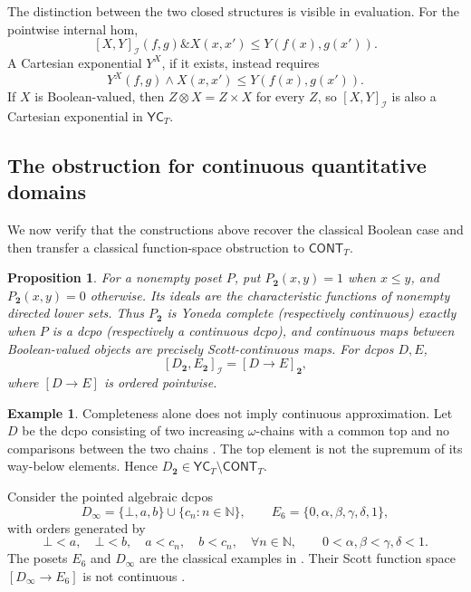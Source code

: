 \documentclass[preprint,3p,times]{elsarticle}
\newtheorem{proposition}[proposition]{Proposition}
\theoremstyle{definition}
\newtheorem{example}[example]{Example}
\theoremstyle{remark}
\newcommand{\I}{\mathcal{I}}
\newcommand{\CONT}{\mathsf{CONT}}
\newcommand{\YC}{\mathsf{YC}}
\newcommand{\tn}{\mathbin{\&}}
\numberwithin{equation}{section}
\begin{document}
The distinction between the two closed structures is visible in evaluation. For the pointwise internal hom,
\[
 [X,Y]_{\I}(f,g)\tn X(x,x')\leq Y(f(x),g(x')).
\]
A Cartesian exponential \(Y^X\), if it exists, instead requires
\[
 Y^X(f,g)\wedge X(x,x')\leq Y(f(x),g(x')).
\]
If \(X\) is Boolean-valued, then \(Z\otimes X=Z\times X\) for every \(Z\), so \([X,Y]_{\I}\) is also a Cartesian exponential in \(\YC_T\).

\subsection{The obstruction for continuous quantitative domains}
We now verify that the constructions above recover the classical Boolean case and then transfer a classical function-space obstruction to \(\CONT_T\).

\begin{proposition}\cite[Sections~9 and~17]{Zhang2024}\label{prop:boolean-correspondence}
For a nonempty poset \(P\), put \(P_{\mathbf2}(x,y)=1\) when \(x\leq y\), and \(P_{\mathbf2}(x,y)=0\) otherwise. Its ideals are the characteristic functions of nonempty directed lower sets. Thus \(P_{\mathbf2}\) is Yoneda complete (respectively continuous) exactly when \(P\) is a dcpo (respectively a continuous dcpo), and continuous maps between Boolean-valued objects are precisely Scott-continuous maps. For dcpos \(D,E\),
\begin{equation}\label{eq:boolean-function}
 [D_{\mathbf2},E_{\mathbf2}]_{\I}=[D\to E]_{\mathbf2},
\end{equation}
where \([D\to E]\) is ordered pointwise.
\end{proposition}



\begin{example}\label{ex:complete-not-continuous}
Completeness alone does not imply continuous approximation. Let \(D\) be the dcpo consisting of two increasing \(\omega\)-chains with a common top and no comparisons between the two chains \cite[Figure~4]{AbramskyJung1994}. The top element is not the supremum of its way-below elements. Hence \(D_{\mathbf2}\in\YC_T\setminus\CONT_T\).
\end{example}

Consider the pointed algebraic dcpos
\[
 D_\infty=\{\bot,a,b\}\cup\{c_n:n\in\mathbb N\},
 \qquad
 E_6=\{0,\alpha,\beta,\gamma,\delta,1\},
\]
with orders generated by
\[
 \bot<a,\quad\bot<b,\quad a<c_n,\quad b<c_n,\quad \forall n\in\mathbb N,
 \qquad
 0<\alpha,\beta<\gamma,\delta<1.
\]
The posets \(E_6\) and \(D_\infty\) are the classical examples in \cite[Figures~11 and~12, respectively]{AbramskyJung1994}. Their Scott function space \([D_\infty\to E_6]\) is not continuous \cite[Lemma~4.3.1]{AbramskyJung1994}.
\end{document}
